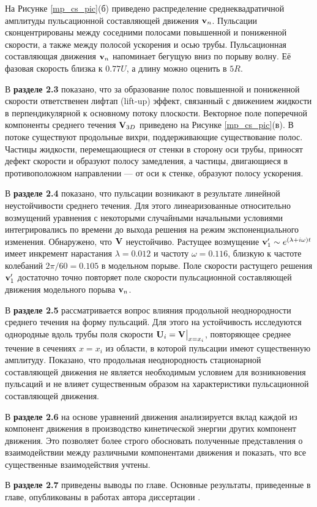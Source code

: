 На Рисунке \ref{mp_cs_pic}(б) приведено распределение среднеквадратичной амплитуды пульсационной составляющей движения $\mathbf{v}_n$. Пульсации сконцентрированы между соседними полосами повышенной и пониженной скорости, а также между полосой ускорения и осью трубы. Пульсационная составляющая движения $\mathbf{v}_n$ напоминает бегущую вниз по порыву волну. Её фазовая скорость близка к $0.77U$, а длину можно оценить в $5R$. 

В \textbf{разделе 2.3} показано, что за образование полос повышенной и пониженной скорости ответственен лифтап (lift-up) эффект, связанный с движением жидкости в перпендикулярной к основному потоку плоскости. 
Векторное поле поперечной компоненты среднего течения $\mathbf{V}_{3D}$ приведено на Рисунке \ref{mp_cs_pic}(в). В потоке существуют продольные вихри, поддерживающие существование полос. 
Частицы жидкости, перемещающиеся от стенки в сторону оси трубы, приносят дефект скорости и образуют полосу замедления, а частицы, двигающиеся в противоположном направлении --- от оси к стенке, образуют полосу ускорения.

В \textbf{разделе 2.4} показано, что пульсации возникают в результате линейной неустойчивости среднего течения. Для этого линеаризованные относительно возмущений уравнения с некоторыми случайными начальными условиями интегрировались по времени до выхода решения на режим экспоненциального изменения. Обнаружено, что $\mathbf{V}$ неустойчиво. Растущее возмущение $\mathbf{v}'_1 \sim e^{(\lambda+i\omega)t}$ имеет инкремент нарастания $\lambda=0.012$ и частоту $\omega=0.116$, близкую к частоте колебаний $2\pi/60=0.105$ в модельном порыве. Поле скорости растущего решения $\mathbf{v}'_1$ достаточно точно повторяет поле скорости пульсационной составляющей движения модельного порыва $\mathbf{v}_n$. 

В \textbf{разделе 2.5} рассматривается вопрос влияния продольной неоднородности среднего течения на форму пульсаций. Для этого на устойчивость исследуются однородные вдоль трубы поля скорости $\mathbf{U}_i = \mathbf{V}\big|_{x=x_i}$, повторяющее среднее течение в сечениях $x = x_i$ из области, в которой пульсации имеют существенную амплитуду. Показано, что продольная неоднородность стационарной составляющей движения не является необходимым условием для возникновения пульсаций и не влияет существенным образом на характеристики пульсационной составляющей движения. 

В \textbf{разделе 2.6} на основе уравнений движения анализируется вклад каждой из компонент движения в производство кинетической энергии других компонент движения. Это позволяет более строго обосновать полученные представления о взаимодействии между различными компонентами движения и показать, что все существенные взаимодействия учтены. %

В \textbf{разделе 2.7} приведены выводы по главе. Основные результаты, приведенные в главе, опубликованы в работах автора диссертации \cite{MZG2015, Kazan2015, KMU2014, KMU2015}.


